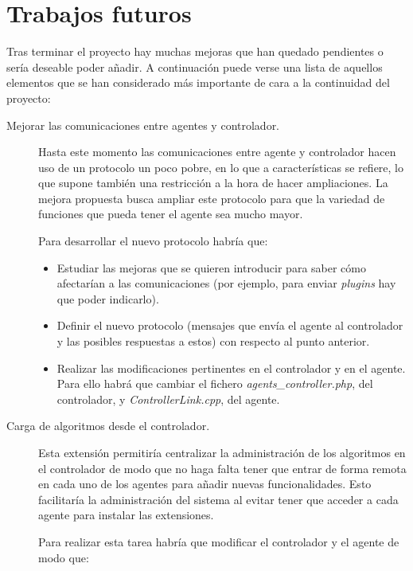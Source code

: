 \chapter{Trabajos futuros}\label{cap6}

Tras terminar el proyecto hay muchas mejoras que han quedado pendientes o sería deseable poder añadir. A continuación puede verse una lista de aquellos elementos que se han considerado más importante de cara a la continuidad del proyecto:

\begin{description}
	\item[Mejorar las comunicaciones entre agentes y controlador.]

		Hasta este momento las comunicaciones entre agente y controlador hacen uso de un protocolo un poco pobre, en lo que a características se refiere, lo que supone también una restricción a la hora de hacer ampliaciones. La mejora propuesta busca ampliar este protocolo para que la variedad de funciones que pueda tener el agente sea mucho mayor.

		Para desarrollar el nuevo protocolo habría que:

		\begin{itemize}
			\item Estudiar las mejoras que se quieren introducir para saber cómo afectarían a las comunicaciones (por ejemplo, para enviar \emph{plugins} hay que poder indicarlo).

			\item Definir el nuevo protocolo (mensajes que envía el agente al controlador y las posibles respuestas a estos) con respecto al punto anterior.

			\item Realizar las modificaciones pertinentes en el controlador y en el agente. Para ello habrá que cambiar el fichero \emph{agents\_controller.php}, del controlador, y \emph{ControllerLink.cpp}, del agente.
		\end{itemize}

	\item[Carga de algoritmos desde el controlador.]

		Esta extensión permitiría centralizar la administración de los algoritmos en el controlador de modo que no haga falta tener que entrar de forma remota en cada uno de los agentes para añadir nuevas funcionalidades. Esto facilitaría la administración del sistema al evitar tener que acceder a cada agente para instalar las extensiones.

		Para realizar esta tarea habría que modificar el controlador y el agente de modo que:


\end{description}
